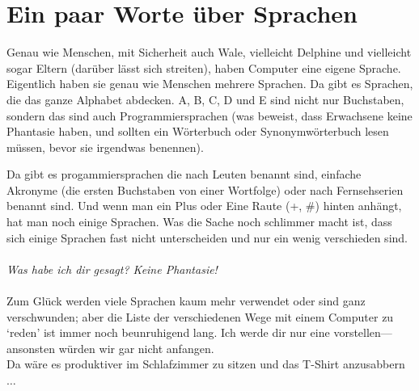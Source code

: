 \section{Ein paar Worte über Sprachen}

Genau wie Menschen, mit Sicherheit auch Wale, vielleicht Delphine und vielleicht sogar Eltern (darüber lässt sich streiten), haben Computer eine eigene Sprache. Eigentlich haben sie genau wie Menschen mehrere Sprachen. Da gibt es Sprachen, die das ganze Alphabet abdecken. A, B, C, D und E sind nicht nur Buchstaben, sondern das sind auch Programmiersprachen (was beweist, dass Erwachsene keine Phantasie haben, und sollten ein Wörterbuch oder Synonymwörterbuch lesen müssen, bevor sie irgendwas benennen).

Da gibt es progammiersprachen die nach Leuten benannt sind, einfache Akronyme (die ersten Buchstaben von einer Wortfolge) oder nach Fernsehserien benannt sind. Und wenn man ein Plus oder Eine Raute (+, \#) hinten anhängt, hat man noch einige Sprachen. Was die Sache noch schlimmer macht ist, dass sich einige Sprachen fast nicht unterscheiden und nur ein wenig verschieden sind.
\\
\\
\emph{Was habe ich dir gesagt? Keine Phantasie!}
\\
\\
Zum Glück werden viele Sprachen kaum mehr verwendet oder sind ganz verschwunden; aber die Liste der verschiedenen Wege mit einem Computer zu `reden' ist immer noch beunruhigend lang. Ich werde dir nur eine vorstellen---ansonsten würden wir gar nicht anfangen.
\\
Da wäre es produktiver im Schlafzimmer zu sitzen und das T-Shirt anzusabbern$\ldots$

